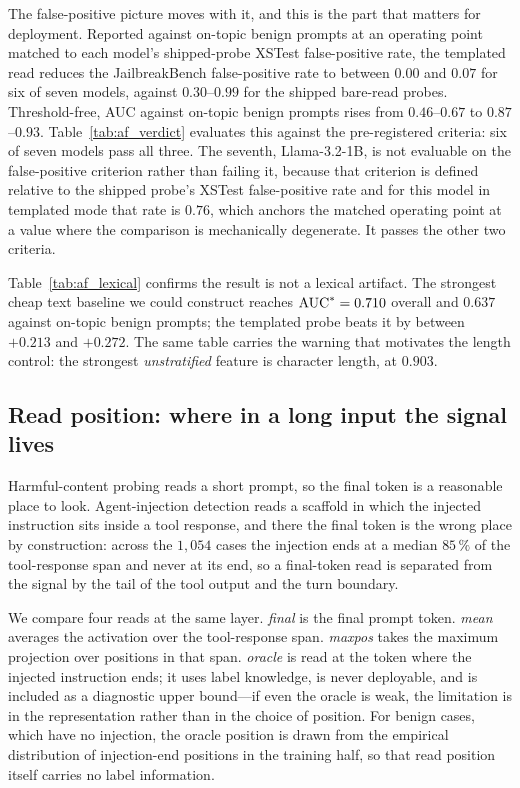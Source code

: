 The false-positive picture moves with it, and this is the part that matters for deployment. Reported against on-topic
benign prompts at an operating point matched to each model's shipped-probe XSTest false-positive rate, the templated
read reduces the JailbreakBench false-positive rate to between $0.00$ and $0.07$ for six of seven models, against
$0.30$--$0.99$ for the shipped bare-read probes. Threshold-free, AUC against on-topic benign prompts rises from
$0.46$--$0.67$ to $0.87$--$0.93$. Table~\ref{tab:af_verdict} evaluates this against the pre-registered criteria: six
of seven models pass all three. The seventh, Llama-3.2-1B, is not evaluable on the false-positive criterion rather
than failing it, because that criterion is defined relative to the shipped probe's XSTest false-positive rate and for
this model in templated mode that rate is $0.76$, which anchors the matched operating point at a value where the
comparison is mechanically degenerate. It passes the other two criteria.



Table~\ref{tab:af_lexical} confirms the result is not a lexical artifact. The strongest cheap text baseline we could
construct reaches $\text{AUC}^{*}{} = 0.710$ overall and $0.637$ against on-topic benign prompts; the templated probe beats
it by between $+0.213$ and $+0.272$. The same table carries the warning that motivates the length control: the
strongest \emph{unstratified} feature is character length, at $0.903$.



\subsection{Read position: where in a long input the signal lives}
\label{sec:read}

Harmful-content probing reads a short prompt, so the final token is a reasonable place to look. Agent-injection
detection reads a scaffold in which the injected instruction sits inside a tool response, and there the final token
is the wrong place by construction: across the $1{,}054$ cases the injection ends at a median $85\,\%$ of the
tool-response span and never at its end, so a final-token read is separated from the signal by the tail of the tool
output and the turn boundary.

We compare four reads at the same layer. \emph{final} is the final prompt token. \emph{mean} averages the activation
over the tool-response span. \emph{maxpos} takes the maximum projection over positions in that span. \emph{oracle} is
read at the token where the injected instruction ends; it uses label knowledge, is never deployable, and is included
as a diagnostic upper bound---if even the oracle is weak, the limitation is in the representation rather than in the
choice of position. For benign cases, which have no injection, the oracle position is drawn from the empirical
distribution of injection-end positions in the training half, so that read position itself carries no label
information.

